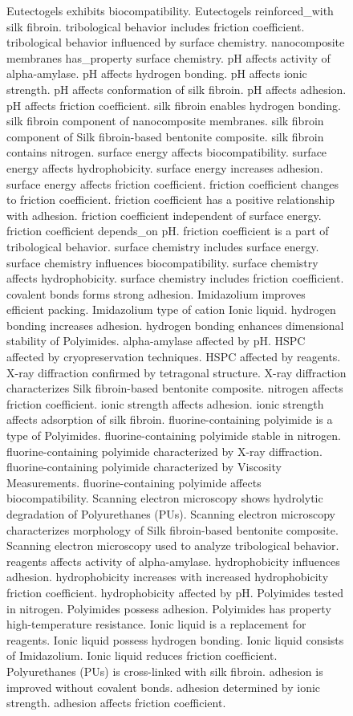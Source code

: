\begin{figure}[htbp]
\begin{mdframed}
    Eutectogels exhibits biocompatibility. Eutectogels reinforced\_with silk fibroin. tribological behavior includes friction coefficient. tribological behavior influenced by surface chemistry. nanocomposite membranes has\_property surface chemistry. pH affects activity of alpha-amylase. pH affects hydrogen bonding. pH affects ionic strength. pH affects conformation of silk fibroin. pH affects adhesion. pH affects friction coefficient. silk fibroin enables hydrogen bonding. silk fibroin component of nanocomposite membranes. silk fibroin component of Silk fibroin-based bentonite composite. silk fibroin contains nitrogen. surface energy affects biocompatibility. surface energy affects hydrophobicity. surface energy increases adhesion. surface energy affects friction coefficient. friction coefficient changes to friction coefficient. friction coefficient has a positive relationship with adhesion. friction coefficient independent of surface energy. friction coefficient depends\_on pH. friction coefficient is a part of tribological behavior. surface chemistry includes surface energy. surface chemistry influences biocompatibility. surface chemistry affects hydrophobicity. surface chemistry includes friction coefficient. covalent bonds forms strong adhesion. Imidazolium improves efficient packing. Imidazolium type of cation Ionic liquid. hydrogen bonding increases adhesion. hydrogen bonding enhances dimensional stability of Polyimides. alpha-amylase affected by pH. HSPC affected by cryopreservation techniques. HSPC affected by reagents. X-ray diffraction confirmed by tetragonal structure. X-ray diffraction characterizes Silk fibroin-based bentonite composite. nitrogen affects friction coefficient. ionic strength affects adhesion. ionic strength affects adsorption of silk fibroin. fluorine-containing polyimide is a type of Polyimides. fluorine-containing polyimide stable in nitrogen. fluorine-containing polyimide characterized by X-ray diffraction. fluorine-containing polyimide characterized by Viscosity Measurements. fluorine-containing polyimide affects biocompatibility. Scanning electron microscopy shows hydrolytic degradation of Polyurethanes (PUs). Scanning electron microscopy characterizes morphology of Silk fibroin-based bentonite composite. Scanning electron microscopy used to analyze tribological behavior. reagents affects activity of alpha-amylase. hydrophobicity influences adhesion. hydrophobicity increases with increased hydrophobicity friction coefficient. hydrophobicity affected by pH. Polyimides tested in nitrogen. Polyimides possess adhesion. Polyimides has property high-temperature resistance. Ionic liquid is a replacement for reagents. Ionic liquid possess hydrogen bonding. Ionic liquid consists of Imidazolium. Ionic liquid reduces friction coefficient. Polyurethanes (PUs) is cross-linked with silk fibroin. adhesion is improved without covalent bonds. adhesion determined by ionic strength. adhesion affects friction coefficient.
    

\end{mdframed}
\end{figure}
